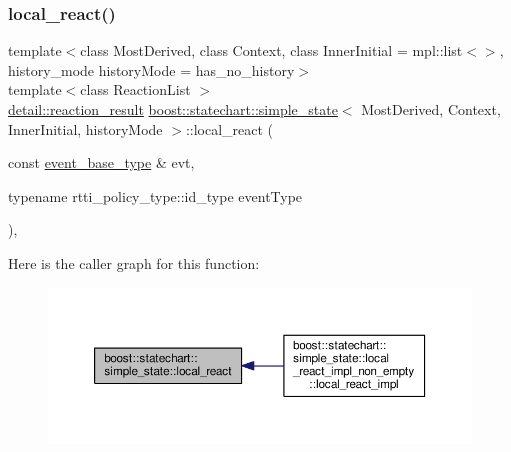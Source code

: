 \mbox{\label{classboost_1_1statechart_1_1simple__state_ac523a4a47f87c4e327d603286bb91b96}} 
\subsubsection{\texorpdfstring{local\+\_\+react()}{local\_react()}}
{\footnotesize\ttfamily template$<$class Most\+Derived, class Context, class Inner\+Initial = mpl\+::list$<$$>$, history\+\_\+mode history\+Mode = has\+\_\+no\+\_\+history$>$ \\
template$<$class Reaction\+List $>$ \\
\mbox{\hyperlink{namespaceboost_1_1statechart_1_1detail_ab091bbb4c29327fb46ee479ea1b7255b}{detail\+::reaction\+\_\+result}} \mbox{\hyperlink{classboost_1_1statechart_1_1simple__state}{boost\+::statechart\+::simple\+\_\+state}}$<$ Most\+Derived, Context, Inner\+Initial, history\+Mode $>$\+::local\+\_\+react (\begin{DoxyParamCaption}\item[{const \mbox{\hyperlink{classboost_1_1statechart_1_1simple__state_a153e115715f5d828021a273ce282ba9b}{event\+\_\+base\+\_\+type}} \&}]{evt,  }\item[{typename rtti\+\_\+policy\+\_\+type\+::id\+\_\+type}]{event\+Type }\end{DoxyParamCaption})\hspace{0.3cm}{\ttfamily [inline]}, {\ttfamily [private]}}

Here is the caller graph for this function\+:
\nopagebreak
\begin{figure}[H]
\begin{center}
\leavevmode
\includegraphics[width=350pt]{classboost_1_1statechart_1_1simple__state_ac523a4a47f87c4e327d603286bb91b96_icgraph}
\end{center}
\end{figure}
\mbox{\label{classboost_1_1statechart_1_1simple__state_a87840a601ed9b0ff517f3d452e6b13f6}} 
